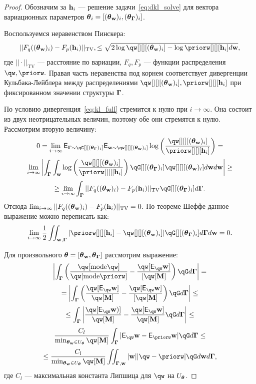 \begin{proof}
Обозначим за $\mathbf{h}_i$ --- решение задачи~\eqref{eq:dkl_solve} для вектора вариационных параметров $\boldsymbol{\theta}_i = [(\boldsymbol{\theta}_\mathbf{w})_i,(\boldsymbol{\theta}_{\boldsymbol{\Gamma}})_i]$.

Воспользуемся неравенством Пинскера:
\[
    ||F_q((\tetaw)_i)-F_p(\h_i)||_\text{TV},\leq\sqrt{2\log{\qw[][][(\tetaw)_i]} - \log{\priorw[][][\h_i]}d\w},
\]
где $||\cdot||_\text{TV}$ --- расстояние по вариации, $F_q, F_p$ --- функции распределения   $\qw,\priorw.$
Правая часть неравенства под корнем соответствует дивергенции Кульбака-Лейблера между распределениями $\qw[][][(\tetaw)_i],\priorw[][][\h_i]$ при фиксированном значении структуры $\boldsymbol{\Gamma}$.

По условию дивергенция~\eqref{eq:kl_full} стремится к нулю при $i \to \infty$. Она состоит из двух неотрицательных величин, поэтому обе они стремятся к нулю.
Рассмотрим вторую величину:
\[
  0 =   \lim_{i \to \infty} \E_{\G \sim \qG[][(\tetaG)_i]} \E_{\w \sim \qw[][][(\tetaw)_i]} \log \left(\frac{\qw[][][(\tetaw)_i]}{\priorw[][][\h_i]}\right) = 
\]
\[
 \lim_{i \to \infty} \left|\int_{\G} \int_{\w} \log \left(\frac{\qw[][][(\tetaw)_i]}{\priorw[][][\h_i]}\right)\qG[][(\tetaG)_i]\qw[][][(\tetaw)_i] d\w d\w \right| \geq  
\]
\[
\geq \lim_{i \to \infty}  \int_{\G} ||F_q((\tetaw)_i)-F_p(\h_i)||_\text{TV}\qG[][(\tetaG)_i] d\G.  
\]
Отсюда $ \lim_{i \to \infty} ||F_q((\boldsymbol{\theta}_\mathbf{w})_i)-F_p(\mathbf{h}_i)||_\text{TV} = 0.$
По теореме Шеффе данное выражение можно переписать как:
\[
    \lim_{i \to \infty}   \frac{1}{2}\iint_{\w,\G} |\priorw[][][\h_i] - \qw[][][(\tetaw)_i]| \qG[][(\tetaG)_i] d\G d\w = 0.
\]

Для произвольного $\boldsymbol{\theta}=[\boldsymbol{\theta}_\mathbf{w}, \boldsymbol{\theta}_{\boldsymbol{\Gamma}}]$ рассмотрим выражение:
\[
   \left|\int_{\G} \left(\frac{\qw[\text{mode}\qw]}{\qw[\text{mode}\priorw]} -  \frac{\qw[\E_{\qw} \w]}{[\qw[\mathbf{M}]} \right)\qG d\G \right| =
\]
\[  = \left|\int_{\G} \left( \frac{\qw[\E_{\qw}\w]}{\qw[\mathbf{M}]} -  \frac{\qw[\E_{\qw} \w]}{[\qw[\mathbf{M}]} \right) \qG d\G\right| \leq 
\]
\[
\leq 
\int_{\G} \left|\frac{\qw[\E_{\qw} \w)]}{{\qw[\mathbf{M}]}} -   \frac{\qw[\E_{\qw} \w]}{\qw[\mathbf{M}]}\qG d\G\right| \leq
\]
\[
\frac{C_l}{\min_{\tetaw \in \Uteta} \qw[\mathbf{M}]}\int_{\G}  |\E_{\qw}\w - \E_{\priorw}\w|\qG d\G  \leq
\]
\[
    \leq \frac{C_l}{\min_{\tetaw \in \Uteta} \qw[\mathbf{M}]} \iint_{\G,\w} |\w| |\qw - \priorw|\qG d\w d\G,
\]
где $C_l$ --- максимальная константа Липшица для $\qw$ на $U_{\boldsymbol{\theta}}$. 


\end{proof}
